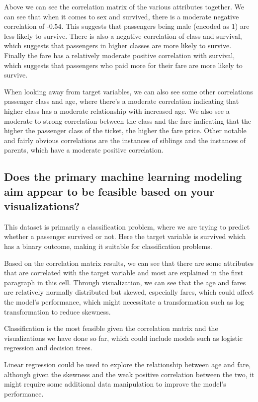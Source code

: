 \documentclass[twoside,11pt]{article}
\begin{document}
Above we can see the correlation matrix of the various attributes together. We can see that when it comes to sex and survived, there is a moderate negative correlation of -0.54. This suggests that passengers being male (encoded as 1) are less likely to survive. There is also a negative correlation of class and survival, which suggests that passengers in higher classes are more likely to survive. Finally the fare has a relatively moderate positive correlation with survival, which suggests that
passengers who paid more for their fare are more likely to survive. 

When looking away from target variables, we can also see some other correlations passenger class and age, where there's a moderate correlation indicating that higher class has a moderate relationship with increased age. We also see a moderate to strong correlation between the class and the fare indicating that the higher the passenger class of the ticket, the higher the fare price. Other notable and fairly obvious correlations are the instances of siblings and the instances of parents, which have a moderate positive correlation.

\subsection*{Does the primary machine learning modeling aim appear to be feasible based on your visualizations?}

This dataset is primarily a classification problem, where we are trying to predict whether a passenger survived or not. Here the target variable is survived which has a binary outcome, making it suitable for classification problems.

Based on the correlation matrix results, we can see that there are some attributes that are correlated with the target variable
and most are explained in the first paragraph in this cell. Through visualization, we can see that the age and fares are relatively
normally distributed but skewed, especially fares, which could affect the model's performance, which might necessitate
a transformation such as log transformation to reduce skewness.

Classification is the most feasible given the correlation matrix and the visualizations we have done so far, which could include models such as logistic regression and decision trees.

Linear regression could be used to explore the relationship between age and fare, although given the skewness and the weak positive correlation between the two, it might require some additional data manipulation to improve the model's performance.
\end{document}
